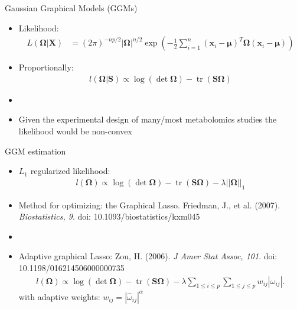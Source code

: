 \documentclass[xcolor=dvipsnames]{beamer}
\DeclareMathOperator{\tr}{tr}
\begin{document}
\begin{frame}{Gaussian Graphical Models (GGMs)}
	\vspace{-15.5pt}
	\begin{itemize}
		\item Likelihood:
		\begin{align*}
		L(\boldsymbol{\Omega}|\textbf{X})&=(2 \pi)^{-np/2}|\boldsymbol{\Omega}|^{n/2} \exp \left(-\frac{1}{2}\sum_{i=1}^{n} (\textbf{x}_i-\boldsymbol{\mu})^T \boldsymbol{\Omega} (\textbf{x}_i-\boldsymbol{\mu})\right) 
		\end{align*}
		\item Proportionally:
		\begin{align*} 
		l(\boldsymbol{\Omega}|\textbf{S})\propto\log (\det \boldsymbol{\Omega})-\tr \left( \textbf{S} \boldsymbol{\Omega} \right)
		\end{align*}
		\item[]
		\item Given the experimental design of many/most metabolomics studies the likelihood would be non-convex
	\end{itemize}
\end{frame}

\begin{frame}{GGM estimation}
	\vspace{-15.5pt}
	\begin{itemize}
		\item $L_1$ regularized likelihood:
		\begin{align*}
		l(\boldsymbol{\Omega})\propto\log (\det \boldsymbol{\Omega})-\tr \left( \textbf{S} \boldsymbol{\Omega} \right)-\lambda ||\boldsymbol{\Omega}||_1
		\end{align*}
		\item Method for optimizing: the Graphical Lasso. Friedman, J., et al. (2007). \emph{Biostatistics, 9}. doi: 10.1093/biostatistics/kxm045
		\item[]
		\item Adaptive graphical Lasso: Zou, H. (2006).  \emph{J Amer Stat Assoc, 101}. doi: 10.1198/016214506000000735 
		\begin{align*}
				l(\boldsymbol{\Omega})\propto \log(\det \boldsymbol{\Omega})-\tr \left(\mathbf{S} \boldsymbol{\Omega}\right) - \lambda \sum_{1\leq i \leq p} \sum_{1 \leq j \leq p} w_{ij} |\omega_{ij}|.
		\end{align*}
		with adaptive weights: $w_{ij}=|\hat{\omega}_{ij}|^\alpha$
	\end{itemize}
\end{frame}
\end{document}
